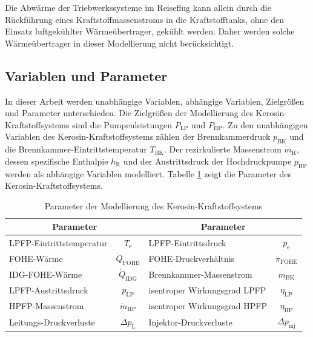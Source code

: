Die Abwärme der Triebwerkssysteme im Reiseflug kann allein durch die Rückführung eines Kraftstoffmassenstroms in die Kraftstofftanks, ohne den Einsatz luftgekühlter Wärmeübertrager, gekühlt werden. Daher werden solche Wärmeübertrager in dieser Modellierung nicht berücksichtigt.

\subsection{Variablen und Parameter}

In dieser Arbeit werden unabhängige Variablen, abhängige Variablen, Zielgrößen und Parameter unterschieden. Die Zielgrößen der Modellierung des Kerosin-Kraftstoffsystems sind die Pumpenleistungen $P_{\mathrm{LP}}$ und $P_{\mathrm{HP}}$. Zu den unabhängigen Variablen des Kerosin-Kraftstoffsystems zählen der Brennkammerdruck $p_{\mathrm{BK}}$ und die Brennkammer-Eintrittstemperatur $T_{\mathrm{BK}}$. Der rezirkulierte Massenstrom $\dot{m}_\mathrm{R}$, dessen spezifische Enthalpie $h_\mathrm{R}$ und der Austrittsdruck der Hochdruckpumpe $p_{\mathrm{HP}}$ werden als abhängige Variablen modelliert. Tabelle \ref{Tab:referenz_params} zeigt die Parameter des Kerosin-Kraftstoffsystems.

\begin{table}[ht]
    \centering
	\caption{Parameter der Modellierung des Kerosin-Kraftstoffsystems}
	\begin{tabular} {|l|c|l|c|} \hline%
		\multicolumn{2}{|c|}{Parameter} & \multicolumn{2}{c|}{Parameter} \\ \hline\hline
        LPFP-Eintrittstemperatur & $T_\mathrm{e}$ & LPFP-Eintrittsdruck & $p_\mathrm{e}$ \\ \hline
        FOHE-Wärme & $\dot{Q}_{\mathrm{FOHE}}$ & FOHE-Druckverhältnis & $\pi_{\mathrm{FOHE}}$ \\ \hline   
        IDG-FOHE-Wärme  & $\dot{Q}_{\mathrm{IDG}}$ &  Brennkammer-Massenstrom & $\dot{m}_\mathrm{BK}$ \\ \hline
        LPFP-Austrittsdruck & $p_{\mathrm{LP}}$ & isentroper Wirkungsgrad LPFP & $\eta_{\mathrm{LP}}$ \\ \hline  
        HPFP-Massenstrom & $\dot{m}_{\mathrm{HP}}$ & isentroper Wirkungsgrad HPFP & $\eta_{\mathrm{HP}}$ \\ \hline
        Leitungs-Druckverluste & $\Delta p_{\mathrm{L}}$& Injektor-Druckverluste & $\Delta p_{\mathrm{inj}}$ \\ \hline
	\end{tabular}	
    \label{Tab:referenz_params}%
\end{table}
\FloatBarrier 

